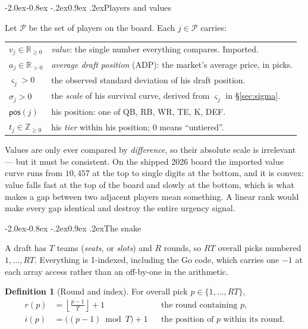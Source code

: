 \documentclass[10pt,a4paper]{article}
\makeatletter
\theoremstyle{plain}
\theoremstyle{definition}
\newtheorem{definition}[theorem]{Definition}
\theoremstyle{remark}
\newcommand{\pos}{\mathsf{pos}}
\renewcommand\subsection{\@startsection{subsection}{2}{\z@}%
  {-2.0ex\@plus -0.8ex \@minus -.2ex}{0.9ex \@plus .2ex}{\normalfont\large\bfseries}}
\makeatother
\begin{document}
\subsection{Players and values}

Let $\mathcal{P}$ be the set of players on the board. Each $j \in \mathcal{P}$ carries:

\begin{center}
\begin{tabular}{ll}
\toprule
$v_j \in \mathbb{R}_{\ge 0}$ & \emph{value}: the single number everything compares. Imported. \\
$a_j \in \mathbb{R}_{> 0}$   & \emph{average draft position} (ADP): the market's average price, in picks. \\
$\varsigma_j > 0$            & the observed standard deviation of his draft position. \\
$\sigma_j > 0$               & the \emph{scale} of his survival curve, derived from $\varsigma_j$ in \S\ref{sec:sigma}. \\
$\pos(j)$                    & his position: one of QB, RB, WR, TE, K, DEF. \\
$t_j \in \mathbb{Z}_{\ge 0}$ & his \emph{tier} within his position; $0$ means ``untiered''. \\
\bottomrule
\end{tabular}
\end{center}

\noindent
Values are only ever compared by \emph{difference}, so their absolute scale is
irrelevant --- but it must be consistent. On the shipped 2026 board the imported value
curve runs from $10{,}457$ at the top to single digits at the bottom, and it is convex:
value falls fast at the top of the board and slowly at the bottom, which is what makes
a gap between two adjacent players mean something. A linear rank would make every gap
identical and destroy the entire urgency signal.

\subsection{The snake}

A draft has $T$ teams (\emph{seats}, or \emph{slots}) and $R$ rounds, so $RT$ overall
picks numbered $1, \dots, RT$. Everything is 1-indexed, including the Go code, which
carries one $-1$ at each array access rather than an off-by-one in the arithmetic.

\begin{definition}[Round and index]
For overall pick $p \in \{1, \dots, RT\}$,
\begin{align}
r(p) &= \left\lfloor \frac{p-1}{T} \right\rfloor + 1 && \text{the round containing $p$,} \label{eq:round}\\
i(p) &= \big((p-1) \bmod T\big) + 1 && \text{the position of $p$ within its round.} \label{eq:index}
\end{align}
\end{definition}
\end{document}
